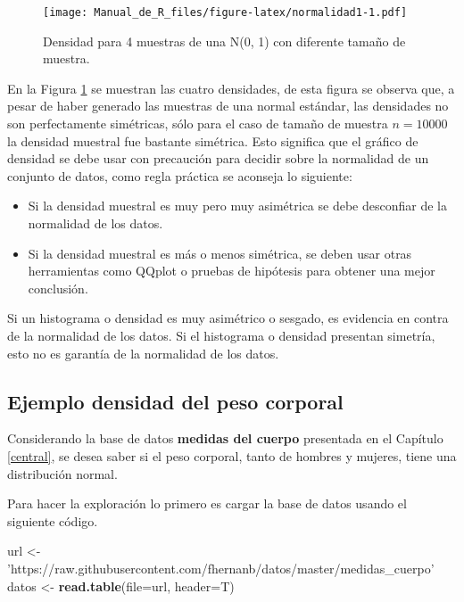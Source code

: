\documentclass[10pt,]{krantz}
\makeatletter
\newenvironment{Shaded}{\begin{snugshade}}{\end{snugshade}}
\newcommand{\KeywordTok}[1]{\textcolor[rgb]{0.13,0.29,0.53}{\textbf{#1}}}
\newcommand{\DataTypeTok}[1]{\textcolor[rgb]{0.13,0.29,0.53}{#1}}
\newcommand{\StringTok}[1]{\textcolor[rgb]{0.31,0.60,0.02}{#1}}
\newcommand{\NormalTok}[1]{#1}
\providecommand{\tightlist}{%
  \setlength{\itemsep}{0pt}\setlength{\parskip}{0pt}}
\newenvironment{kframe}{%
\medskip{}
\setlength{\fboxsep}{.8em}
 \def\at@end@of@kframe{}%
 \ifinner\ifhmode%
  \def\at@end@of@kframe{\end{minipage}}%
  \begin{minipage}{\columnwidth}%
 \fi\fi%
 \def\FrameCommand##1{\hskip\@totalleftmargin \hskip-\fboxsep
 \colorbox{shadecolor}{##1}\hskip-\fboxsep
     \hskip-\linewidth \hskip-\@totalleftmargin \hskip\columnwidth}%
 \MakeFramed {\advance\hsize-\width
   \@totalleftmargin\z@ \linewidth\hsize
   \@setminipage}}%
 {\par\unskip\endMakeFramed%
 \at@end@of@kframe}
\renewenvironment{Shaded}{\begin{kframe}}{\end{kframe}}
\let\BeginKnitrBlock\begin \let\EndKnitrBlock\end
\makeatother
\begin{document}
\begin{figure}
\centering
\texttt{[image: Manual\_de\_R\_files/figure-latex/normalidad1-1.pdf]}
\caption{\label{fig:normalidad1}Densidad para 4 muestras de una N(0, 1) con
diferente tamaño de muestra.}
\end{figure}

En la Figura \ref{fig:normalidad1} se muestran las cuatro densidades, de
esta figura se observa que, a pesar de haber generado las muestras de
una normal estándar, las densidades no son perfectamente simétricas,
sólo para el caso de tamaño de muestra \(n=10000\) la densidad muestral
fue bastante simétrica. Esto significa que el gráfico de densidad se
debe usar con precaución para decidir sobre la normalidad de un conjunto
de datos, como regla práctica se aconseja lo siguiente:

\begin{itemize}
\tightlist
\item
  Si la densidad muestral es muy pero muy asimétrica se debe desconfiar
  de la normalidad de los datos.
\item
  Si la densidad muestral es más o menos simétrica, se deben usar otras
  herramientas como QQplot o pruebas de hipótesis para obtener una mejor
  conclusión.
\end{itemize}

\BeginKnitrBlock{rmdwarning}
Si un histograma o densidad es muy asimétrico o sesgado, es evidencia en
contra de la normalidad de los datos. Si el histograma o densidad
presentan simetría, esto no es garantía de la normalidad de los datos.
\EndKnitrBlock{rmdwarning}

\subsection*{Ejemplo densidad del peso
corporal}\label{ejemplo-densidad-del-peso-corporal}


Considerando la base de datos \textbf{medidas del cuerpo} presentada en
el Capítulo \ref{central}, se desea saber si el peso corporal, tanto de
hombres y mujeres, tiene una distribución normal.

Para hacer la exploración lo primero es cargar la base de datos usando
el siguiente código.

\begin{Shaded}
\begin{Highlighting}[]
\NormalTok{url <-}\StringTok{ 'https://raw.githubusercontent.com/fhernanb/datos/master/medidas_cuerpo'}
\NormalTok{datos <-}\StringTok{ }\KeywordTok{read.table}\NormalTok{(}\DataTypeTok{file=}\NormalTok{url, }\DataTypeTok{header=}\NormalTok{T)}
\end{Highlighting}
\end{Shaded}
\end{document}
